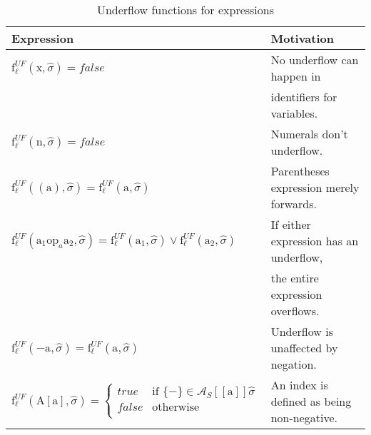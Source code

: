\begin{table}[h]
\begin{tabular}{| l | l |}
  \hline
  Expression & Motivation\\
  \hline
  \hline
  $\text{f}_\ell^{UF} (\text{x},\widehat{\sigma}) = false $ & No underflow can happen in \\ 
                                                            & identifiers for variables.\\
  \hline
  $\text{f}_\ell^{UF} (\text{n},\widehat{\sigma}) = false $ & Numerals don't underflow.\\
  \hline
  $\text{f}_\ell^{UF} ((\text{a}),\widehat{\sigma}) = \text{f}_\ell^{UF} (\text{a},\widehat{\sigma}) $ & Parentheses expression merely forwards.\\
  \hline
  $\text{f}_\ell^{UF} (\text{a}_1 \text{op}_a \text{a}_2, \widehat{\sigma}) = \text{f}_\ell^{UF} (\text{a}_1,\widehat{\sigma}) \vee \text{f}_\ell^{UF} (\text{a}_2,\widehat{\sigma}) $ & If either expression has an underflow,\\
                                & the entire expression overflows.\\
  \hline
  $\text{f}_\ell^{UF} (-\text{a},\widehat{\sigma}) = \text{f}_\ell^{UF} (\text{a},\widehat{\sigma}) $ & Underflow is unaffected by negation.\\
  \hline
  $\text{f}_\ell^{UF} (\text{A}[\text{a}],\widehat{\sigma}) = 
     \begin{cases} 
        true   & \text{if } \{-\} \in \mathcal{A}_S [\![\text{a}]\!]\widehat{\sigma}\\
        false  & \text{otherwise} \\
     \end{cases}
   $ & An index is defined as being non-negative.\\
  \hline
\end{tabular}
\centering
\caption{Underflow functions for expressions}
\label{table:underflow_functions_expressions}
\end{table}


